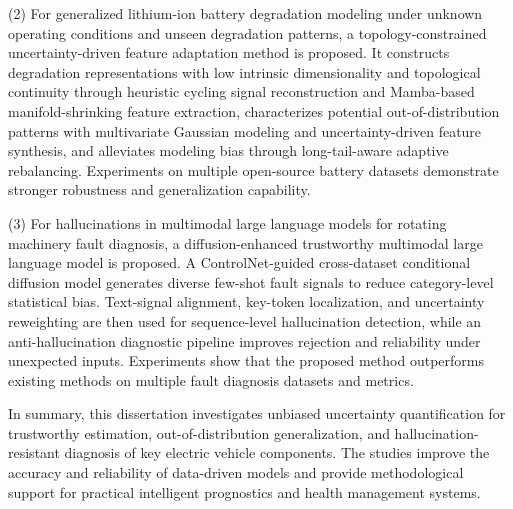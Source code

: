 (2) For generalized lithium-ion battery degradation modeling under unknown operating conditions and unseen degradation patterns, a topology-constrained uncertainty-driven feature adaptation method is proposed. It constructs degradation representations with low intrinsic dimensionality and topological continuity through heuristic cycling signal reconstruction and Mamba-based manifold-shrinking feature extraction, characterizes potential out-of-distribution patterns with multivariate Gaussian modeling and uncertainty-driven feature synthesis, and alleviates modeling bias through long-tail-aware adaptive rebalancing. Experiments on multiple open-source battery datasets demonstrate stronger robustness and generalization capability.

(3) For hallucinations in multimodal large language models for rotating machinery fault diagnosis, a diffusion-enhanced trustworthy multimodal large language model is proposed. A ControlNet-guided cross-dataset conditional diffusion model generates diverse few-shot fault signals to reduce category-level statistical bias. Text-signal alignment, key-token localization, and uncertainty reweighting are then used for sequence-level hallucination detection, while an anti-hallucination diagnostic pipeline improves rejection and reliability under unexpected inputs. Experiments show that the proposed method outperforms existing methods on multiple fault diagnosis datasets and metrics.

In summary, this dissertation investigates unbiased uncertainty quantification for trustworthy estimation, out-of-distribution generalization, and hallucination-resistant diagnosis of key electric vehicle components. The studies improve the accuracy and reliability of data-driven models and provide methodological support for practical intelligent prognostics and health management systems.


